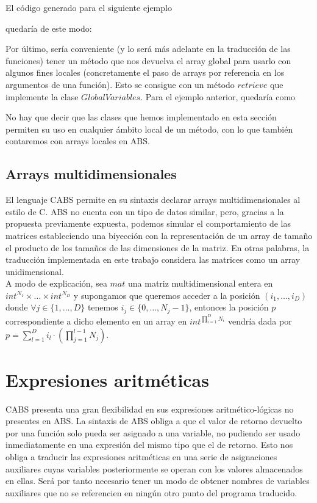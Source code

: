 El código generado para el siguiente ejemplo



quedaría de este modo:



Por último, sería conveniente (y lo será más adelante en la traducción de las funciones) tener un método que nos devuelva el array global para usarlo con algunos fines locales (concretamente el paso de arrays por referencia en los argumentos de una función). Esto se consigue con un método $retrieve$ que implemente la clase $GlobalVariables$. Para el ejemplo anterior, quedaría como



No hay que decir que las clases que hemos implementado en esta sección permiten su uso en cualquier ámbito local de un método, con lo que también contaremos con arrays locales en ABS.

\subsection{Arrays multidimensionales}

El lenguaje CABS permite en su sintaxis declarar arrays multidimensionales al estilo de C. ABS no cuenta con un tipo de datos similar, pero, gracias a la propuesta previamente expuesta, podemos simular el comportamiento de las matrices estableciendo una biyección con la representación de un array de tamaño el producto de los tamaños de las dimensiones de la matriz. En otras palabras, la traducción implementada en este trabajo considera las matrices como un array unidimensional.\\

A modo de explicación, sea $mat$ una matriz multidimensional entera en $int^{N_1} \times \dots \times int^{N_D}$ y supongamos que queremos acceder a la posición $(i_1, \dots, i_D)$ donde $\forall j \in \{1, \dots, D\}$ tenemos $i_j \in \{0, \dots, N_j - 1\}$, entonces la posición $p$ correspondiente a dicho elemento en un array en $int^{\prod_{i = 1}^{D} N_i}$ vendría dada por $p = \sum_{l = 1}^{D} i_l \cdot (\prod_{j=1}^{l - 1} N_j)$.

\section{Expresiones aritméticas}

CABS presenta una gran flexibilidad en sus expresiones aritmético-lógicas no presentes en ABS. La sintaxis de ABS obliga a que el valor de retorno devuelto por una función solo pueda ser asignado a una variable, no pudiendo ser usado inmediatamente en una expresión del mismo tipo que el de retorno. Esto nos obliga a traducir las expresiones aritméticas en una serie de asignaciones auxiliares cuyas variables posteriormente se operan con los valores almacenados en ellas. Será por tanto necesario tener un modo de obtener nombres de variables auxiliares que no se referencien en ningún otro punto del programa traducido.\\

